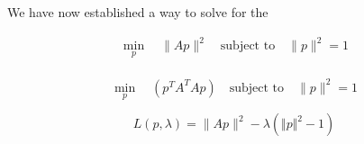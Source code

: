 We have now established a way to solve for the

\begin{gather}
    \min_{p} \quad \lVert Ap \rVert ^2 \quad \text{subject to} \quad \lVert p \rVert^2 = 1 \\
\end{gather}


\begin{equation}
    \min_{p} \quad (p^T A^T Ap) \quad \text{subject to} \quad \lVert p \rVert^2 = 1
\end{equation}

\begin{equation}
    L(p, \lambda) = \lVert Ap \rVert ^2 - \lambda \left( \Vert p \Vert^2 - 1 \right)
\end{equation}




